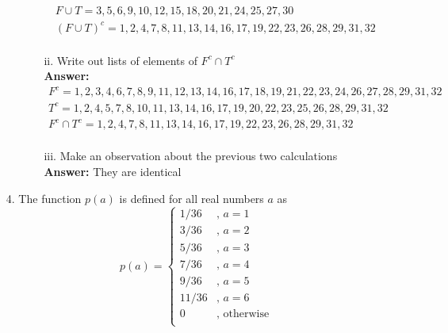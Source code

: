 \documentclass[a4paper]{article}
\begin{document}
\begin{itemize}
\begin{itemize}
\begin{itemize}
\begin{equation}
\begin{split}
	      	      	      		F \cup T = {3, 5, 6, 9, 10, 12, 15, 18, 20, 21, 24, 25, 27, 30} \\
	      	      	      		(F \cup T)^{c} = {1, 2, 4, 7, 8, 11, 13, 14, 16, 17, 19, 22, 23, 26, 28, 29, 31, 32} \\
	      	      	      	\end{split}
	      	      	      \end{equation}
	      	      	\item[ii.] Write out lists of elements of $F^{c} \cap T^{c}$ \\
	      	      	      \textbf{Answer:}
	      	      	      \begin{equation}
	      	      	      	\begin{split}
	      	      	      		F^{c} = {1, 2, 3, 4, 6, 7, 8, 9, 11, 12, 13, 14, 16, 17, 18, 19, 21, 22, 23, 24, 26, 27, 28, 29, 31, 32} \\
	      	      	      		T^{c} = {1, 2, 4, 5, 7, 8, 10, 11, 13, 14, 16, 17, 19, 20, 22, 23, 25, 26, 28, 29, 31, 32} \\
	      	      	      		F^{c} \cap T^{c} = {1, 2, 4, 7, 8, 11, 13, 14, 16, 17, 19, 22, 23, 26, 28, 29, 31, 32} \\
	      	      	      	\end{split}
	      	      	      \end{equation}
	      	      	\item[iii.] Make an observation about the previous two calculations \\
	      	      	      \textbf{Answer:} They are identical
	      	      \end{itemize}  
	      \end{itemize}
	\item[4.] The function $p(a)$ is defined for all real numbers $a$ as \\
	      \[
	      	p(a) =
	      	\begin{cases}
	      		1/36  & \text{, $a = 1$}   \\
	      		3/36  & \text{, $a = 2$}   \\
	      		5/36  & \text{, $a = 3$}   \\
	      		7/36  & \text{, $a = 4$}   \\
	      		9/36  & \text{, $a = 5$}   \\
	      		11/36 & \text{, $a = 6$}   \\
	      		0     & \text{, otherwise} \\
	      	\end{cases}
\]
\end{itemize}
\end{document}

